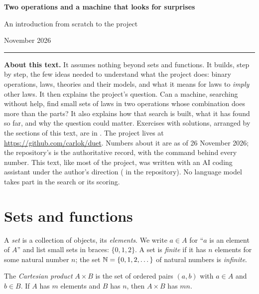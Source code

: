 \documentclass[11pt,a4paper]{article}
\begin{document}
\thispagestyle{empty}

\begin{center}
{\Large\bfseries Two operations and a machine that looks for surprises\par}
\medskip
{\large An introduction from scratch to the \proj{} project\par}
 November 2026\par
\medskip
\rule{0.3\textwidth}{0.4pt}
\end{center}

\medskip
\noindent\textbf{About this text.} It assumes nothing beyond sets and functions. It builds, step by step, the few
ideas needed to understand what the \proj{} project does: binary operations, laws, theories and their models, and what
it means for laws to \emph{imply} other laws. It then explains the project's question. Can a machine, searching
without help, find small sets of laws in two operations whose combination does more than the parts? It also
explains how that search is built, what it has found so far, and why the question could matter.
Exercises with solutions, arranged by the sections of this text, are in . The project lives at
\url{https://github.com/carlok/duet}. Numbers about it are as of 26 November 2026; the repository's  is
the authoritative record, with the command behind every number. This text, like most of the project, was written with
an AI coding assistant under the author's direction ( in the repository). No language model
takes part in the search or its scoring.

\medskip
\renewcommand{\contentsname}{Contents}
\tableofcontents


\section{Sets and functions}

A \emph{set} is a collection of objects, its \emph{elements}. We write $a\in A$ for ``$a$ is an element of $A$'' and
list small sets in braces: $\{0,1,2\}$. A set is \emph{finite} if it has $n$ elements for some natural number $n$;
the set $\mathbb{N}=\{0,1,2,\dots\}$ of natural numbers is \emph{infinite}.

The \emph{Cartesian product} $A\times B$ is the set of ordered pairs $(a,b)$ with $a\in A$ and $b\in B$. If $A$ has
$m$ elements and $B$ has $n$, then $A\times B$ has $mn$.
\end{document}
